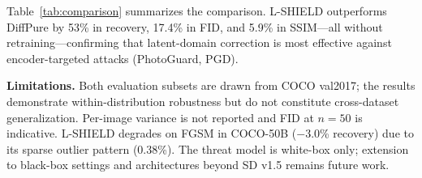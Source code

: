 \documentclass[conference]{IEEEtran}
\begin{document}
Table~\ref{tab:comparison} summarizes the comparison.
L-SHIELD outperforms DiffPure by 53\% in recovery, 17.4\% in FID, and 5.9\%
in SSIM---all without retraining---confirming that latent-domain correction
is most effective against encoder-targeted attacks (PhotoGuard, PGD).

\begin{table}[t]
\caption{Comparison with Prior Defense Methods on COCO-50. Recovery\% and FID
scores are averages across all four attacks. Input Transform and Adversarial
Training are not evaluated on the Stable Diffusion img2img pipeline in this
study; their evaluation is outside the scope of this work.}
\label{tab:comparison}
\centering
\renewcommand{\arraystretch}{1.12}
\end{table}


\textbf{Limitations.}
Both evaluation subsets are drawn from COCO val2017; the results demonstrate
within-distribution robustness but do not constitute cross-dataset
generalization. Per-image variance is not reported and FID at $n{=}50$ is
indicative. L-SHIELD degrades on FGSM in COCO-50B ($-$3.0\% recovery) due to
its sparse outlier pattern (0.38\%). The threat model is white-box only;
extension to black-box settings and architectures beyond SD v1.5 remains future
work.
\end{document}
